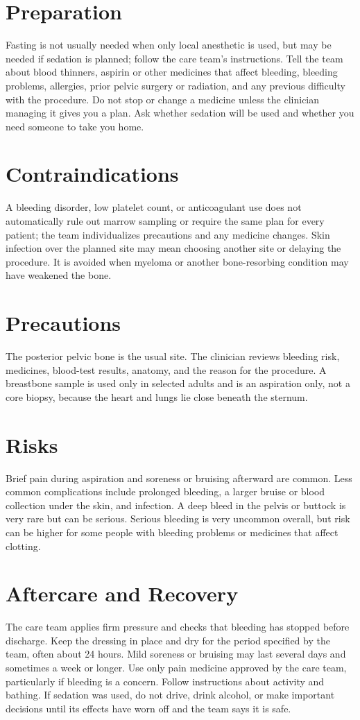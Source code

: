 \section*{Preparation}
Fasting is not usually needed when only local anesthetic is used, but may be needed if sedation is planned; follow the care team's instructions. Tell the team about blood thinners, aspirin or other medicines that affect bleeding, bleeding problems, allergies, prior pelvic surgery or radiation, and any previous difficulty with the procedure. Do not stop or change a medicine unless the clinician managing it gives you a plan. Ask whether sedation will be used and whether you need someone to take you home.

\section*{Contraindications}
A bleeding disorder, low platelet count, or anticoagulant use does not automatically rule out marrow sampling or require the same plan for every patient; the team individualizes precautions and any medicine changes. Skin infection over the planned site may mean choosing another site or delaying the procedure. It is avoided when myeloma or another bone-resorbing condition may have weakened the bone.

\section*{Precautions}
The posterior pelvic bone is the usual site. The clinician reviews bleeding risk, medicines, blood-test results, anatomy, and the reason for the procedure. A breastbone sample is used only in selected adults and is an aspiration only, not a core biopsy, because the heart and lungs lie close beneath the sternum.

\section*{Risks}
Brief pain during aspiration and soreness or bruising afterward are common. Less common complications include prolonged bleeding, a larger bruise or blood collection under the skin, and infection. A deep bleed in the pelvis or buttock is very rare but can be serious. Serious bleeding is very uncommon overall, but risk can be higher for some people with bleeding problems or medicines that affect clotting.

\section*{Aftercare and Recovery}
The care team applies firm pressure and checks that bleeding has stopped before discharge. Keep the dressing in place and dry for the period specified by the team, often about 24 hours. Mild soreness or bruising may last several days and sometimes a week or longer. Use only pain medicine approved by the care team, particularly if bleeding is a concern. Follow instructions about activity and bathing. If sedation was used, do not drive, drink alcohol, or make important decisions until its effects have worn off and the team says it is safe.

